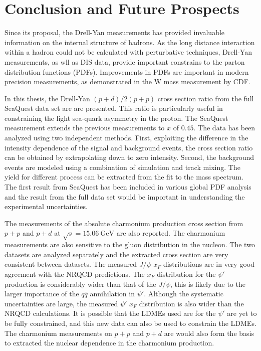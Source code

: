 \documentclass[../main.tex]{subfiles}
\begin{document}
\ifSubfilesClassLoaded{
	\mainmatter
	\setcounter{chapter}{5}
}{}

\chapter{Conclusion and Future Prospects}
\label{ch:conclusion}
Since its proposal, the Drell-Yan measurements has provided invaluable information
on the internal structure of hadrons. As the long distance interaction within a
hadron could not be calculated with perturbative techniques, Drell-Yan measurements,
as wll as DIS data, provide important constrains to the parton distribution functions
(PDFs). Improvements in PDFs are important in modern precision measurements, as
demonstrated in the W mass measurement by CDF.

In this thesis, the Drell-Yan $(p+d)/2(p+p)$ cross section ratio from the full
SeaQuest data set are are presented. This ratio is particularly useful in constraining
the light sea-quark asymmetry in the proton. The SeaQuest measurement extends the
previous measurements to $x$ of $0.45$.
The data has been analyzed using two independent methods. First, exploiting the
difference in the intensity dependence of the signal and background events, the
cross section ratio can be obtained by extrapolating down to zero intensity.
Second, the background events are modeled using a combination of simulation and
track mixing. The yield for different process can be extracted from the fit to
the mass spectrum.
The first result from SeaQuest has been included in various global PDF analysis
and the result from the full data set would be important in understanding the
experimental uncertainties.

The measurements of the absolute charmonium production cross section from $p+p$
and $p+d$ at $\sqrt{s}=\SI{15.06}{\GeV}$ are also reported. The charmonium measurements
are also sensitive to the gluon distribution in the nucleon. The two datasets
are analyzed separately and the extracted cross section are very consistent between
datasets. The measured
$J/\psi$ $x_F$ distributions are in very good agreement with the NRQCD predictions.
The $x_F$ distribution for the $\psi'$ production is considerably wider than that of the
$J/\psi$, this is likely due to the larger importance of the $q\bar{q}$ annihilation
in $\psi'$. Although the systematic uncertainties are large, the measured $\psi'$
$x_F$ distribution is also wider than the NRQCD calculations. It is possible that
the LDMEs used are for the $\psi'$ are yet to be fully constrained, and this new
data can also be used to constrain the LDMEs.
The charmonium measurements on $p+p$ and $p+d$ are would also form the basis to
extracted the nuclear dependence in the charmonium production.
\end{document}
